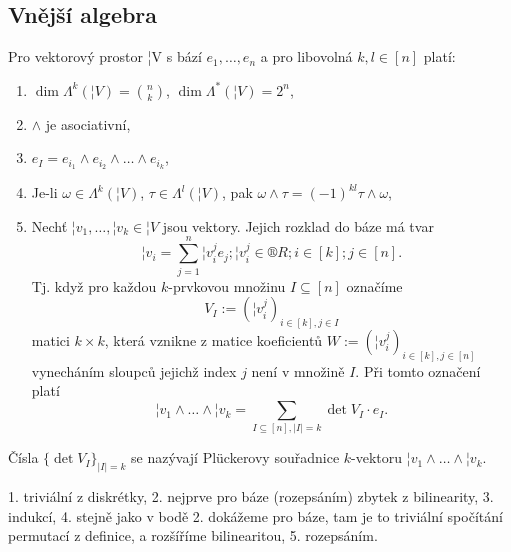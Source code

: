 \documentclass[12pt]{article}                   %
\begin{document}
    \subsection{Vnější algebra}
        \begin{veta}
            Pro vektorový prostor ¦V s bází $e_1, …, e_n$ a pro libovolná $k, l \in [n]$ platí:
        
            \begin{enumerate}
                \item $\dim \Lambda^k(¦V) = \binom{n}{k}$, $\dim \Lambda^*(¦V) = 2^n$,
                \item $\wedge$ je asociativní,
                \item $e_I = e_{i_1} \wedge e_{i_2} \wedge … \wedge e_{i_k}$,
                \item Je-li $\omega \in \Lambda^k(¦V)$, $\tau \in \Lambda^l(¦V)$, pak $\omega \wedge \tau = (-1)^{kl} \tau \wedge \omega$,
                \item Nechť $¦v_1, …, ¦v_k \in ¦V$ jsou vektory. Jejich rozklad do báze má tvar
                    $$ ¦v_i = \sum_{j=1}^n ¦v_i^j e_j; ¦v_i^j \in ®R; i \in [k]; j \in [n]. $$
                    Tj. když pro každou $k$-prvkovou množinu $I \subseteq [n]$ označíme
                    $$ V_I := (¦v_i^j)_{i \in [k], j \in I} $$
                    matici $k \times k$, která vznikne z matice koeficientů $W := (¦v_i^j)_{i \in [k], j \in [n]}$ vynecháním sloupců jejichž index $j$ není v množině $I$. Při tomto označení platí
                    $$ ¦v_1 \wedge … \wedge ¦v_k = \sum_{I \subseteq [n], |I|=k} \det V_I·e_I. $$
            \end{enumerate}

            Čísla $\{\det V_I\}_{|I|=k}$ se nazývají Plückerovy souřadnice $k$-vektoru $¦v_1 \wedge … \wedge ¦v_k$.

            \begin{dukazin}
                1. triviální z diskrétky, 2. nejprve pro báze (rozepsáním) zbytek z bilinearity, 3. indukcí, 4. stejně jako v bodě 2. dokážeme pro báze, tam je to triviální spočítání permutací z definice, a rozšíříme bilinearitou, 5. rozepsáním.
            \end{dukazin}
        \end{veta}
\end{document}
